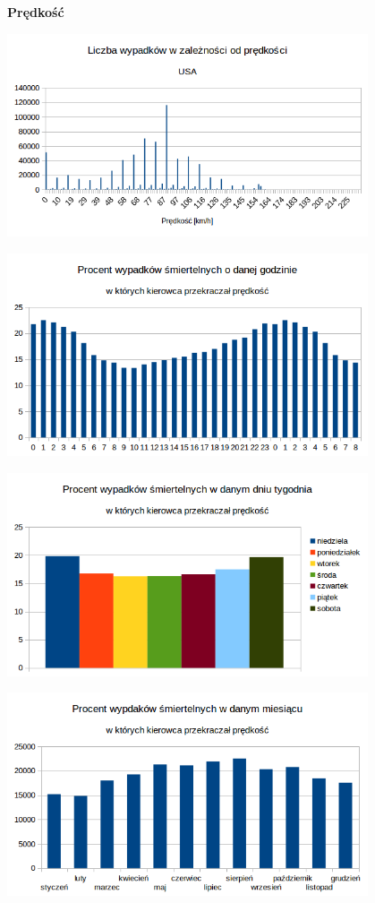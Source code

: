 \textbf{Prędkość}

\includegraphics[width=0.8\textwidth]{images/hipotheses/speed/speed.png}

\includegraphics[width=0.8\textwidth]{images/hipotheses/speed/speed_exceeded_by_hour.png}

\includegraphics[width=0.8\textwidth]{images/hipotheses/speed/speed_exceeded_by_day_of_week.png}

\includegraphics[width=0.8\textwidth]{images/hipotheses/speed/speed_exceeded_by_month.png}

